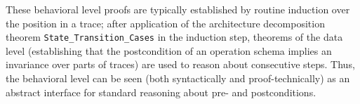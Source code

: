 \documentclass[a4paper,pdftex]{article}
\def\inlinesml{\lstinline[style=sml]}
\newenvironment{holz-ml}{\comment}{\endcomment}
\begin{document}
These behavioral level proofs are typically established by routine
induction over the position in a trace; after application of the
architecture decomposition theorem \inlinesml+State_Transition_Cases+ in
the induction step, theorems of the data level (establishing that the
postcondition of an operation schema implies an invariance over parts of
traces) are used to reason about consecutive steps.  Thus, the
behavioral level can be seen (both syntactically and proof-technically)
as an abstract interface for standard reasoning about pre- and
postconditions.






\end{document}
